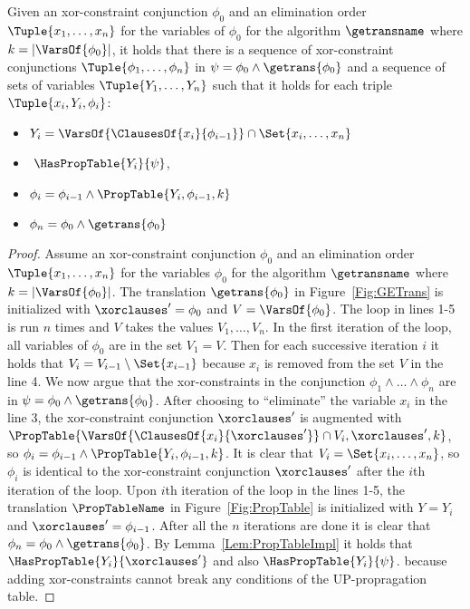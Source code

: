 \begin{lemma}
\label{Lem:GEConjunctions}
Given an xor-constraint conjunction $\phi_0$ 
and an elimination order
$\Tuple{x_1,\dots,x_n}$ for the variables of $\phi_0$ for the algorithm
$\getransname$ where $k=|\VarsOf{\phi_0}|$, it holds that there is a sequence of xor-constraint conjunctions $
\Tuple{\phi_1,\dots,\phi_n}$ in $ \psi = \phi_0 \wedge \getrans{\phi_0} $ and a sequence of sets of variables
$\Tuple{Y_1,\dots,Y_n}$ such that
it holds for each triple $ \Tuple{x_i,Y_i,\phi_i}$:
\begin{itemize}
\item $ Y_i = \VarsOf{\ClausesOf{x_i}{\phi_{i-1}}} \cap \Set{x_i,\dots,x_n} $
\item $ \HasPropTable{Y_i}{\psi}$,
\item $\phi_i = \phi_{i-1} \wedge \PropTable{Y_i,\phi_{i-1}, k}$
\item $\phi_n = \phi_0 \wedge \getrans{\phi_0}$
\end{itemize}
\end{lemma}
\begin{proof}
Assume an xor-constraint conjunction $ \phi_0 $ and an elimination
order $ \Tuple{x_1,\dots,x_n}$ for the variables $ \phi_0$
for the algorithm $ \getransname$ where $k=|\VarsOf{\phi_0}|$.
The translation $ \getrans{\phi_0} $ in Figure~\ref{Fig:GETrans} is initialized with $ \xorclauses' = \phi_0
$ and $ V = \VarsOf{\phi_0} $. The loop in lines 1-5 is run $n$ times and $V$
takes the values $ V_1,\dots,V_n$. In the first iteration of the loop, all
variables of $ \phi_0 $ are in the set $ V_1 = V$. Then for each successive
iteration $ i $ it holds that $ V_i = V_{i-1} \setminus \Set{x_{i-1}} $ because
$ x_i $ is removed from the set $ V$ in the line 4. 
We now argue that the xor-constraints in the conjunction  $ \phi_1 \wedge \dots \wedge \phi_n$ are in $ \psi = \phi_0 \wedge \getrans{\phi_0} $. 
After choosing to ``eliminate'' the variable $ x_i$ in the line 3, the
xor-constraint conjunction $ \xorclauses' $ is augmented with $
\PropTable{\VarsOf{\ClausesOf{x_i}{\xorclauses'}} \cap V_i, \xorclauses', k}$,
    so $\phi_i = \phi_{i-1} \wedge \PropTable{Y_i,\phi_{i-1}, k}$.
It is clear that $ V_i = \Set{x_i, \dots, x_n}$, so $ \phi_i $ is identical to
the xor-constraint conjunction $ \xorclauses'$ after the $i$th iteration of the
loop.
Upon $i$th iteration of the loop in the lines 1-5,       
the translation $ \PropTableName $ in Figure~\ref{Fig:PropTable} is initialized
with $Y = Y_i $ and $ \xorclauses' = \phi_{i-1}$. 
After all the $n$ iterations are done it is clear that $ \phi_n = \phi_0
\wedge \getrans{\phi_0}$.
By Lemma~\ref{Lem:PropTableImpl} 
it holds that $ \HasPropTable{Y_i}{\xorclauses'}$
and also $ \HasPropTable{Y_i}{\psi}$.
because adding xor-constraints cannot break any conditions
of the UP-propragation table.
\end{proof}


